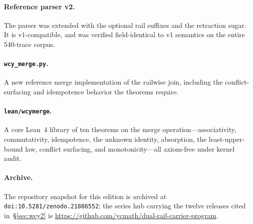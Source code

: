 \documentclass[11pt,a4paper]{article}
\begin{document}
\paragraph{Reference parser v2.} The parser was extended with the optional
rail suffixes and the retraction sugar. It is v1-compatible, and was verified
field-identical to v1 semantics on the entire 540-trace corpus.

\paragraph{\texttt{wcy\_merge.py}.} A new reference merge implementation of the
railwise join, including the conflict-surfacing and idempotence behavior the
theorems require.

\paragraph{\texttt{lean/wcymerge}.} A core Lean~4 library of ten theorems on
the merge operation---associativity, commutativity, idempotence, the unknown
identity, absorption, the least-upper-bound law, conflict surfacing, and
monotonicity---all axiom-free under kernel audit.

\paragraph{Archive.} The repository snapshot for this edition is archived at
\texttt{doi:10.5281/zenodo.21886552}; the series hub carrying the twelve
releases cited in~\S\ref{sec:wcy2} is
\url{https://github.com/ycmath/dual-rail-carrier-program}.
\end{document}
